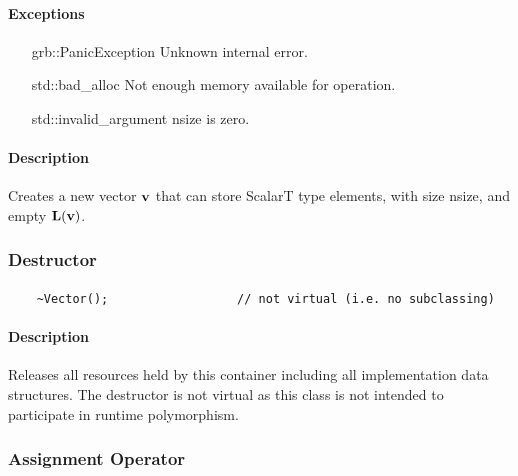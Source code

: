 \paragraph{Exceptions}

\begin{itemize}[leftmargin=2.1in]
    \item[{\sf grb::PanicException}]   Unknown internal error.
    \item[{\sf std::bad\_alloc}]        Not enough memory available for operation.
    \item[{\sf std::invalid\_argument}] {\sf nsize} is zero.
\end{itemize}

\paragraph{Description}

Creates a new vector ${\bf v}$ that can store {\sf ScalarT} type elements, with size {\sf nsize}, 
and empty $\mathbf{L}({\bf v})$.


\subsubsection{Destructor}

\paragraph{\syntax}

\begin{verbatim}
    ~Vector();                  // not virtual (i.e. no subclassing)
\end{verbatim}

\paragraph{Description}

Releases all resources held by this container including all implementation data structures.
The destructor is not virtual as this class is not intended to participate in runtime polymorphism.

\subsubsection{Assignment Operator}

